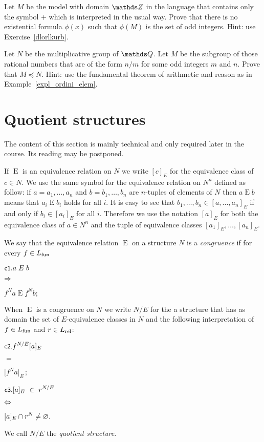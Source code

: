 \documentclass[creche.tex]{subfiles}
\begin{document}
\begin{exercise}
Let $M$ be the model with domain $\ZZ$ in the language that contains only the symbol $+$ which is interpreted in the usual way.
Prove that there is no existential formula $\phi(x)$ such that $\phi(M)$ is the set of odd integers.
Hint: use Exercise~\ref{dlorlkurb}.\QED
\end{exercise}


\begin{exercise}
Let $N$ be the multiplicative group of $\QQ$.
Let $M$ be the subgroup of those rational numbers that are of the form $n/m$ for some odd integers $m$ and $n$.
Prove that $M\preceq N$.
Hint: use the fundamental theorem of arithmetic and reason as in Example~\ref{expl_ordini_elem}.\QED
\end{exercise}


\section{Quotient structures}\label{quotient}
\def\ceq#1#2#3{\parbox[b]{20ex}{$\displaystyle #1$}\parbox[b]{6ex}{\hfil$#2$}$\displaystyle #3$}

The content of this section is mainly technical and only required later in the course.
Its reading may be postponed.


If $\mathrel{E}$ is an equivalence relation on $N$ we write \emph{$[c]_E$\/} for the equivalence class of $c\in N$.
We use the same symbol for the equivalence relation on $N^n$ defined as follow: if $a=a_1,\dots,a_n$ and $b=b_1,\dots,b_n$ are $n$-tuples of elements of $N$ then \emph{$a\mathrel{E} b$\/} means that  $a_i\mathrel{E} b_i$ holds for all $i$.
It is easy to see that $b_1,\dots,b_n\in [a, ..., a_n]_E$ if and only if $b_i \in [a_i]_E$ for all $i$.
 Therefore we use the notation \emph{$[a]_E$\/} for both the equivalence class of $a\in N^n$ and the tuple of equivalence classes $[a_1]_E,\dots,[a_n]_E$.

\begin{definition}\label{def_congruence}
We say that the equivalence relation $\mathrel{E}$ on a structure $N$ is a \emph{congruence\/} if for every $f\in L_{\rm fun}$

\ceq{\ssf{c1}.\hfill a\mathrel{E} b}{\IMP}{f^N a\mathrel{E} f^N b;}

When $\mathrel{E}$ is a congruence on $N$ we write \emph{$N/E$\/} for the a structure that has as domain the set of $E$-equivalence classes in $N$ and the following interpretation of $f\in L_{\rm fun}$ and $r\in L_{\rm rel}$:

\ceq{\ssf{c2.}\hfill f^{N/E}[a]_E}{=}{\big[f^N a\big]_E\,;}

\ceq{\ssf{c3.}\hfill [a]_E\ \in\ r^{N/E}}{\IFF}{[a]_E\cap r^{N}\neq\0.}

We call $N/E$ the \emph{quotient structure}.\QED
\end{definition}
\end{document}
